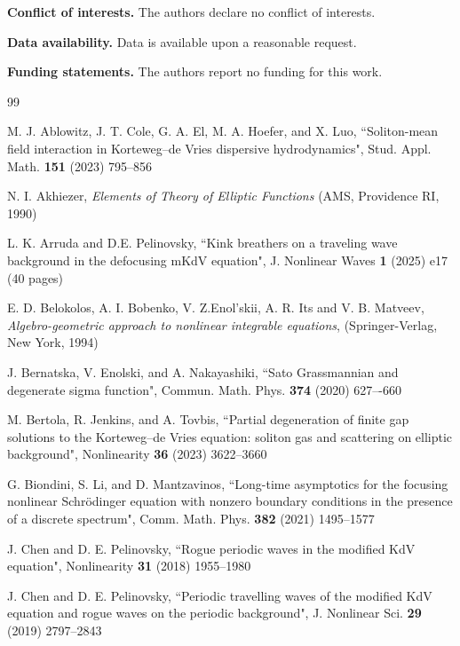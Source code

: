 \documentclass[12pt,reqno]{amsart}
\numberwithin{equation}{section}
\begin{document}
\vspace{0.2cm}

{\bf Conflict of interests.}  The authors declare no conflict of interests. 

\vspace{0.2cm}

{\bf Data availability.}  Data is available upon a reasonable request.

\vspace{0.2cm}

{\bf Funding statements.}  The authors report no funding for this work. 


\begin{thebibliography}{99}
	
	 M. J. Ablowitz, J. T. Cole, G. A. El, M. A. Hoefer, and X. Luo, ``Soliton-mean field interaction in Korteweg--de Vries dispersive hydrodynamics", Stud. Appl. Math. {\bf 151} (2023) 795--856
	
	 N. I. Akhiezer, {\it Elements of Theory of Elliptic Functions} (AMS, Providence RI, 1990)
		
	 L. K. Arruda and D.E. Pelinovsky, ``Kink breathers on a traveling wave background in the defocusing mKdV equation", J. Nonlinear Waves {\bf 1} (2025) e17 (40 pages)
	
	 E. D. Belokolos, A. I. Bobenko, V. Z.Enol'skii, A. R. Its and V. B. Matveev, {\it Algebro-geometric approach to nonlinear integrable equations}, (Springer-Verlag, New York, 1994)
	
	 J. Bernatska, V. Enolski, and A. Nakayashiki, ``Sato Grassmannian and degenerate sigma function", Commun. Math. Phys. {\bf 374} (2020) 627–-660
	
	 M. Bertola, R. Jenkins, and A. Tovbis, 
	``Partial degeneration of finite gap solutions to the Korteweg--de
	Vries equation: soliton gas and scattering on elliptic background", 
	Nonlinearity {\bf 36} (2023) 3622--3660
	
		 G. Biondini, S. Li, and D. Mantzavinos, ``Long-time asymptotics for the focusing nonlinear Schr\"{o}dinger equation with nonzero boundary conditions in the presence of a discrete spectrum", 
	Comm. Math. Phys. {\bf 382} (2021)  1495--1577
	
  J. Chen and D. E. Pelinovsky, ``Rogue periodic waves in the modified KdV equation", Nonlinearity {\bf 31} (2018) 1955--1980

 J. Chen and D. E. Pelinovsky, ``Periodic travelling waves of the modified KdV equation and rogue waves on the periodic background", J. Nonlinear Sci. {\bf 29} (2019) 2797--2843


\end{thebibliography}
\end{document}

